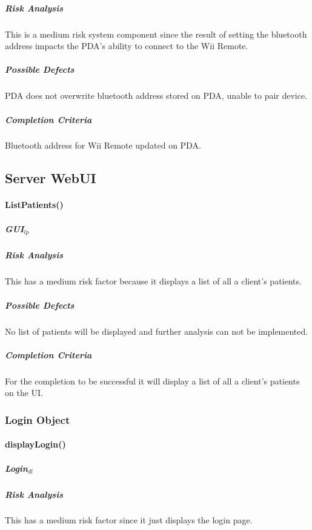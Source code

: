 \documentclass{article}
\begin{document}
\subparagraph{Risk Analysis}
This is a medium risk system component since the result of setting the bluetooth address impacts the PDA's ability to connect to the Wii Remote.

\subparagraph{Possible Defects}
PDA does not overwrite bluetooth address stored on PDA, unable to pair device.
\subparagraph{Completion Criteria}
Bluetooth address for Wii Remote updated on PDA.


\subsection{Server WebUI}

\paragraph{ListPatients()}

\subparagraph{GUI$_{lp}$}

\subparagraph{Risk Analysis}
This has a medium risk factor because it displays a list of all a client's patients.

\subparagraph{Possible Defects}
No list of patients will be displayed and further analysis can not be implemented.

\subparagraph{Completion Criteria}
For the completion to be successful it will display a list of all a client's patients on the UI.

\subsubsection{Login Object}

\paragraph{displayLogin()}

\subparagraph{Login$_{dl}$}

\subparagraph{Risk Analysis}
This has a medium risk factor since it just displays the login page.
\end{document}
